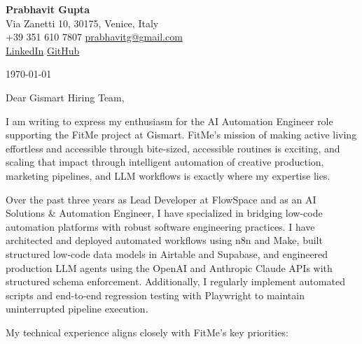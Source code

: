 \documentclass[11pt,a4paper]{article}
\begin{document}
\begin{center}
    {\huge \textbf{Prabhavit Gupta}} \\
    \vspace{4pt}
    Via Zanetti 10, 30175, Venice, Italy \\
    +39 351 610 7807 \textbar{} \href{mailto:prabhavitg@gmail.com}{prabhavitg@gmail.com} \\
    \href{https://www.linkedin.com/in/prabhavit/}{LinkedIn} \textbar{} \href{https://github.com/prab-gupta}{GitHub}
\end{center}

\vspace{14pt}

\noindent \today

\vspace{6pt}

\noindent Dear Gismart Hiring Team,

\vspace{6pt}

\noindent I am writing to express my enthusiasm for the AI Automation Engineer role supporting the FitMe project at Gismart. FitMe's mission of making active living effortless and accessible through bite-sized, accessible routines is exciting, and scaling that impact through intelligent automation of creative production, marketing pipelines, and LLM workflows is exactly where my expertise lies.

\noindent Over the past three years as Lead Developer at FlowSpace and as an AI Solutions \& Automation Engineer, I have specialized in bridging low-code automation platforms with robust software engineering practices. I have architected and deployed automated workflows using n8n and Make, built structured low-code data models in Airtable and Supabase, and engineered production LLM agents using the OpenAI and Anthropic Claude APIs with structured schema enforcement. Additionally, I regularly implement automated scripts and end-to-end regression testing with Playwright to maintain uninterrupted pipeline execution.

\noindent My technical experience aligns closely with FitMe's key priorities:
\end{document}
